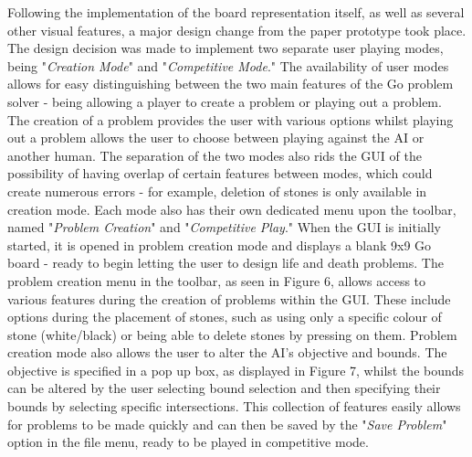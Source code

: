 \documentclass{l3proj}
\begin{document}
Following the implementation of the board representation itself, as well as several other visual features, a major design change from the paper prototype took place. The design decision was made to implement two separate user playing modes, being "\textit{Creation Mode}" and "\textit{Competitive Mode}." The availability of user modes allows for easy distinguishing between the two main features of the Go problem solver - being allowing a player to create a problem or playing out a problem. The creation of a problem provides the user with various options whilst playing out a problem allows the user to choose between playing against the AI or another human. The separation of the two modes also rids the GUI of the possibility of having overlap of certain features between modes, which could create numerous errors - for example, deletion of stones is only available in creation mode. Each mode also has their own dedicated menu upon the toolbar, named "\textit{Problem Creation}" and "\textit{Competitive Play}."
When the GUI is initially started, it is opened in problem creation mode and displays a blank 9x9 Go board - ready to begin letting the user to design life and death problems. The problem creation menu in the toolbar, as seen in Figure 6, allows access to various features during the creation of problems within the GUI. These include options during the placement of stones, such as using only a specific colour of stone (white/black) or being able to delete stones by pressing on them. Problem creation mode also allows the user to alter the AI's objective and bounds. The objective is specified in a pop up box, as displayed in Figure 7, whilst the bounds can be altered by the user selecting bound selection and then specifying their bounds by selecting specific intersections. This collection of features easily allows for problems to be made quickly and can then be saved by the "\textit{Save Problem}" option in the file menu, ready to be played in competitive mode.
\end{document}
